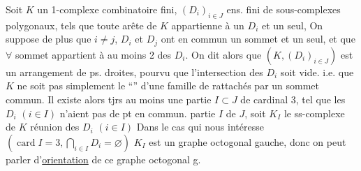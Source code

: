 Soit $K$ un 1-complexe combinatoire fini,
$(D_i)_{i\in J}$   ens. fini de sous-complexes
polygonaux, tels que toute arête de $K$ appartienne
à un $D_i$ et un seul,  On
suppose de plus que  $i\ne j$, $D_i$ et $D_j$
ont en commun un sommet et un
seul, et que $\forall$ sommet  appartient à au
moins 2 des $D_i$. On dit alors que
$(K,(D_i)_{i\in J})$ est un arrangement  de ps. droites,
\deleted{\unsure{$\forall$}} pourvu que l'intersection des $D_i$ soit vide.
i.e. que $K$ ne soit pas simplement le ``''
d'une famille de 
rattachés par un sommet  commun. Il existe alors
tjrs au moins une partie $I\subset J$ de cardinal
3, tel que les $D_i$ $(i\in I)$ n'aient
pas de pt en commun.  
%
  partie $I$ de $J$, soit $K_I$ le ss-complexe
de $K$  réunion des $D_i$ $(i\in I)$
%
Dans le cas qui nous intéresse $(\operatorname{card} I=3,
\bigcap_{i\in I}D_i=\varnothing)$  $K_I$ est un graphe
octogonal gauche, donc on peut parler
d'\uline{orientation} de ce graphe octogonal g.
